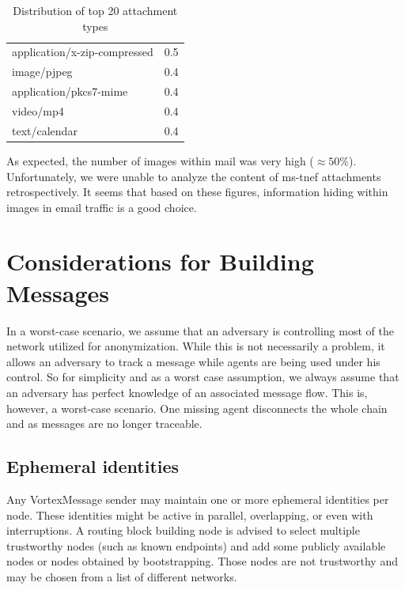\begin{table}[H]
\begin{tabular}{l|r}
		application/x-zip-compressed                                                &    0.5\\
		image/pjpeg                                                                 &    0.4\\
		application/pkcs7-mime                                                      &    0.4\\
		video/mp4                                                                   &    0.4\\
		text/calendar                                                               &    0.4\\\hline
	\end{tabular}
	\caption{Distribution of top 20 attachment types}
	\label{tab:emailAttachments}
\end{table}

As expected, the number of images within mail was very high ($\approx 50\%$). Unfortunately, we were unable to analyze the content of ms-tnef attachments retrospectively. It seems that based on these figures, information hiding within images in email traffic is a good choice.

\section{Considerations for Building Messages}
In a worst-case scenario, we assume that an adversary is controlling most of the network utilized for anonymization. While this is not necessarily a problem, it allows an adversary to track a message while agents are being used under his control. So for simplicity and as a worst case assumption, we always assume that an adversary has perfect knowledge of an associated message flow. This is, however, a worst-case scenario. One missing agent disconnects the whole chain and as messages are no longer traceable.

\subsection{Ephemeral identities}
Any VortexMessage sender may maintain one or more ephemeral identities per node. These identities might be active in parallel, overlapping, or even with interruptions. A routing block building node is advised to select multiple trustworthy nodes (such as known endpoints) and add some publicly available nodes or nodes obtained by bootstrapping. Those nodes are not trustworthy and may be chosen from a list of different networks.

